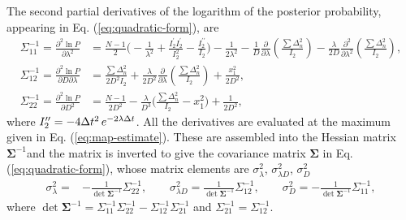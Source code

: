 \documentclass[english,aps, onecolumn, prl,superscriptaddress, notitlepage]{revtex4-1}
\begin{document}
The second partial derivatives of the logarithm of the posterior probability, appearing in Eq. (\ref{eq:quadratic-form}),
are 
\begin{align*}
\Sigma_{11}^{-1}=\frac{\partial^{2}\ln P}{\partial\lambda^{2}} & =\frac{N-1}{2}\Big(-\frac{1}{\lambda^{2}}+\frac{I_{2}^{\prime}I_{2}^{\prime}}{I_{2}^{2}}-\frac{I_{2}^{\prime\prime}}{I_{2}}\Big)-\frac{1}{2\lambda^{2}}\nonumber
  -\frac{1}{D}\frac{\partial}{\partial\lambda}\left(\frac{\sum\Delta_{n}^{2}}{I_{2}}\right)-\frac{\lambda}{2D}\frac{\partial^{2}}{\partial\lambda^{2}}\left(\frac{\sum\Delta_{n}^{2}}{I_{2}}\right),
 \\
\Sigma_{12}^{-1}=\frac{\partial^{2}\ln P}{\partial D\partial\lambda} & =\frac{\sum\Delta_{n}^{2}}{2D^{2}I_{2}}+\frac{\lambda}{2D^{2}}\frac{\partial}{\partial\lambda}\left(\frac{\sum\Delta_{n}^{2}}{I_{2}}\right)+\frac{x_{1}^{2}}{2D^{2}},
\\
\Sigma_{22}^{-1}=\frac{\partial^{2}\ln P}{\partial D^{2}} & =\frac{N-1}{2D^{2}}-\frac{\lambda}{D^{3}}\Big(\frac{\sum\Delta_{n}^{2}}{I_{2}}-x_{1}^{2}\Big)+\frac{1}{2D^{2}},
\end{align*}
where $I_{2}^{\prime\prime}=-4\Delta t^{2}\thinspace e^{-2\lambda\Delta t}$.
All the derivatives are evaluated at the maximum given in Eq. (\ref{eq:map-estimate}).
These are assembled into the Hessian matrix $\boldsymbol{\Sigma}^{-1}$and
the matrix is inverted to give the covariance matrix $\boldsymbol{\Sigma}$
in Eq. (\ref{eq:quadratic-form}), whose matrix elements are $\sigma_{\lambda}^{2}$,
$\sigma_{\lambda D}^{2}$, $\sigma_{D}^{2}$ 
\begin{align*}
\sigma_{\lambda}^{2}= &  -\frac{1}{\det\boldsymbol{\Sigma}^{-1}}\Sigma_{22}^{-1},\qquad\sigma_{\lambda D}^{2}=\frac{1}{\det\boldsymbol{\Sigma}^{-1}}\Sigma_{12}^{-1},\qquad
\sigma_{D}^{2}=  -\frac{1}{\det\boldsymbol{\Sigma}^{-1}}\Sigma_{11}^{-1},
\end{align*}
where $\det\boldsymbol{\Sigma}^{-1}=\Sigma_{11}^{-1}\Sigma_{22}^{-1}-\Sigma_{12}^{-1}\Sigma_{21}^{-1}$
and $\Sigma_{21}^{-1}=\Sigma_{12}^{-1}$.
\end{document}
